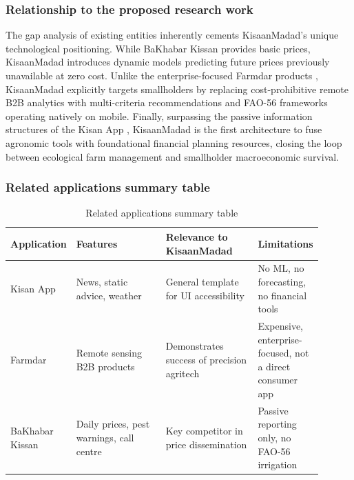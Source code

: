 \documentclass{FastFyp}
\begin{document}
\subsubsection{Relationship to the proposed research work}
The gap analysis of existing entities inherently cements KisaanMadad's unique technological positioning. While BaKhabar Kissan \cite{bakhabarkissan2024} provides basic prices, KisaanMadad introduces dynamic models predicting future prices \cite{murugesan2022forecasting} previously unavailable at zero cost. Unlike the enterprise-focused Farmdar products \cite{farmdar2024}, KisaanMadad explicitly targets smallholders by replacing cost-prohibitive remote B2B analytics with multi-criteria recommendations and FAO-56 \cite{allen1998crop} frameworks operating natively on mobile. Finally, surpassing the passive information structures of the Kisan App \cite{kisanapp2024}, KisaanMadad is the first architecture to fuse agronomic tools with foundational financial planning resources, closing the loop between ecological farm management and smallholder macroeconomic survival.

\subsubsection{Related applications summary table}
\begin{table}[ht]
  \centering
  \caption{Related applications summary table}
  \label{tab:related_apps}
  \begin{tabular}{p{0.15\linewidth} p{0.30\linewidth} p{0.30\linewidth} p{0.15\linewidth}}
    \toprule
    \textbf{Application} & \textbf{Features} & \textbf{Relevance to KisaanMadad} & \textbf{Limitations} \\
    \midrule
    Kisan App \cite{kisanapp2024} & News, static advice, weather & General template for UI accessibility & No ML, no forecasting, no financial tools \\
    Farmdar \cite{farmdar2024} & Remote sensing B2B products & Demonstrates success of precision agritech & Expensive, enterprise-focused, not a direct consumer app \\
    BaKhabar Kissan \cite{bakhabarkissan2024} & Daily prices, pest warnings, call centre & Key competitor in price dissemination & Passive reporting only, no FAO-56 irrigation \\
    \bottomrule
  \end{tabular}
\end{table}

\pagebreak
 


\pagebreak

 



\setcounter{chapter}{8}


{

}
\end{document}
